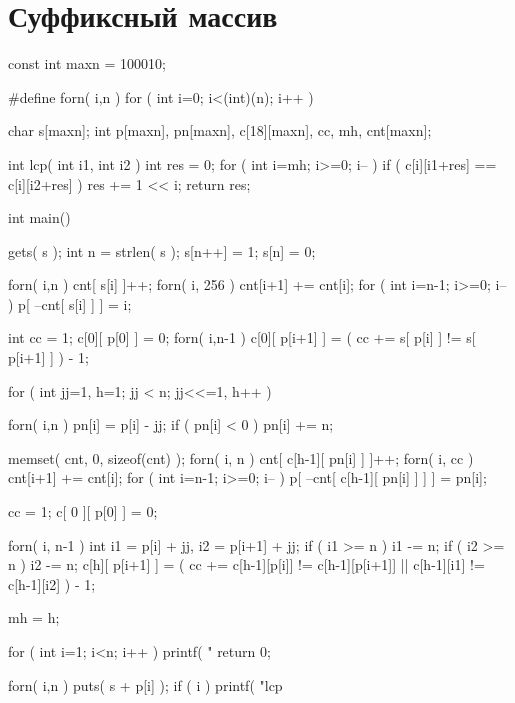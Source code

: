 \documentclass[12pt, titlepage]{article}
\begin{document}
\section{Суффиксный массив}
\begin{cppcode}
const int maxn = 100010;

#define forn( i,n ) for ( int i=0; i<(int)(n); i++ )

char s[maxn];
int p[maxn], pn[maxn], c[18][maxn], cc, mh, cnt[maxn];

int lcp( int i1, int i2 )
{
  int res = 0;
  for ( int i=mh; i>=0; i-- )
                 if ( c[i][i1+res] == c[i][i2+res] )
                   res += 1 << i;
  return res;
}          

int main()
{
  gets( s );
  int n = strlen( s );
  s[n++] = 1;
  s[n] = 0;

  forn( i,n ) cnt[ s[i] ]++;
  forn( i, 256 ) cnt[i+1] += cnt[i];
  for ( int i=n-1; i>=0; i-- ) p[ --cnt[ s[i] ] ] = i;

  int cc = 1;
  c[0][ p[0] ] = 0;
  forn( i,n-1 ) c[0][ p[i+1] ] = ( cc += s[ p[i] ] != s[ p[i+1] ] ) - 1;

  for ( int jj=1, h=1; jj < n; jj<<=1, h++ )
  {                        
    forn( i,n )
    {
      pn[i] = p[i] - jj;
      if ( pn[i] < 0 ) pn[i] += n;
    }

    memset( cnt, 0, sizeof(cnt) );
    forn( i, n ) cnt[ c[h-1][ pn[i] ] ]++;
    forn( i, cc ) cnt[i+1] += cnt[i];
    for ( int i=n-1; i>=0; i-- )
	p[ --cnt[ c[h-1][ pn[i] ] ] ] = pn[i];

	cc = 1;
	c[ 0 ][ p[0] ] = 0;
     
 	forn( i, n-1 )
 	{
 	  int i1 = p[i] + jj, i2 = p[i+1] + jj;
 	  if ( i1 >= n ) i1 -= n;
 	  if ( i2 >= n ) i2 -= n;
 	  c[h][ p[i+1] ] = ( cc += c[h-1][p[i]] != c[h-1][p[i+1]] || c[h-1][i1] != c[h-1][i2] ) - 1;
 	}

 	mh = h;
  }

  for ( int i=1; i<n; i++ ) printf( "%
  return 0;

  forn( i,n )
  {
    puts( s + p[i] );
    if ( i )
    printf( "lcp %
  }
}
\end{cppcode}
\end{document}
